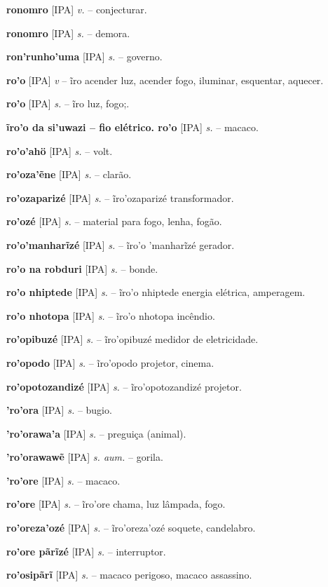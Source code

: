 \textbf{ronomro} [IPA] \textit{v.} -- conjecturar.

\textbf{ronomro} [IPA] \textit{s.} -- demora.

\textbf{ron'runho'uma} [IPA] \textit{s.} -- governo.

\textbf{ro'o} [IPA] \textit{v} -- ĩro acender luz, acender fogo, iluminar, esquentar, aquecer.

\textbf{ro'o} [IPA] \textit{s.} -- ĩro luz, fogo;.

\textbf{ĩro'o da si'uwazi -- fio elétrico. ro'o} [IPA] \textit{s.} -- macaco.

\textbf{ro'o'ahö} [IPA] \textit{s.} -- volt.

\textbf{ro'oza'ẽne} [IPA] \textit{s.} -- clarão.

\textbf{ro'ozaparizé} [IPA] \textit{s.} -- ĩro'ozaparizé transformador.

\textbf{ro'ozé} [IPA] \textit{s.} -- material para fogo, lenha, fogão.

\textbf{ro'o'manharĩzé} [IPA] \textit{s.} -- ĩro'o 'manharĩzé gerador.

\textbf{ro'o na robduri} [IPA] \textit{s.} -- bonde.

\textbf{ro'o nhiptede} [IPA] \textit{s.} -- ĩro'o nhiptede energia elétrica, amperagem.

\textbf{ro'o nhotopa} [IPA] \textit{s.} -- ĩro'o nhotopa incêndio.

\textbf{ro'opibuzé} [IPA] \textit{s.} -- ĩro'opibuzé medidor de eletricidade.

\textbf{ro'opodo} [IPA] \textit{s.} -- ĩro'opodo projetor, cinema.

\textbf{ro'opotozandizé} [IPA] \textit{s.} -- ĩro'opotozandizé projetor.

\textbf{'ro'ora} [IPA] \textit{s.} -- bugio.

\textbf{'ro'orawa'a} [IPA] \textit{s.} -- preguiça (animal).

\textbf{'ro'orawawẽ} [IPA] \textit{s. aum.} -- gorila.

\textbf{'ro'ore} [IPA] \textit{s.} -- macaco.

\textbf{ro'ore} [IPA] \textit{s.} -- ĩro'ore chama, luz lâmpada, fogo.

\textbf{ro'oreza'ozé} [IPA] \textit{s.} -- ĩro'oreza'ozé soquete, candelabro.

\textbf{ro'ore pãrĩzé} [IPA] \textit{s.} -- interruptor.

\textbf{ro'osipãrĩ} [IPA] \textit{s.} -- macaco perigoso, macaco assassino.

